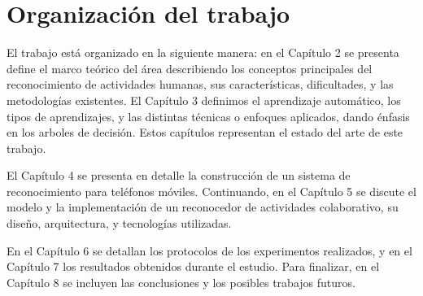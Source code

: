 \section{Organización del trabajo}

\label{sec14:organizaciuxf3n-del-trabajo}

El trabajo está organizado en la siguiente manera: en el Capítulo
2 se presenta define el marco teórico del área describiendo los conceptos
principales del reconocimiento de actividades humanas, sus características,
dificultades, y las metodologías existentes. El Capítulo 3 definimos
el aprendizaje automático, los tipos de aprendizajes, y las distintas
técnicas o enfoques aplicados, dando énfasis en los arboles de decisión.
Estos capítulos representan el estado del arte de este trabajo.

El Capítulo 4 se presenta en detalle la construcción de un sistema
de reconocimiento para teléfonos móviles. Continuando, en el Capítulo
5 se discute el modelo y la implementación de un reconocedor de actividades
colaborativo, su diseño, arquitectura, y tecnologías utilizadas.

En el Capítulo 6 se detallan los protocolos de los experimentos realizados,
y en el Capítulo 7 los resultados obtenidos durante el estudio. Para
finalizar, en el Capítulo 8 se incluyen las conclusiones y los posibles
trabajos futuros. 

